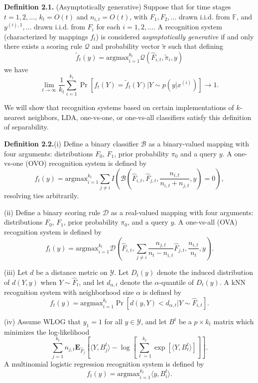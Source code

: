 \documentclass{article}
\newcommand{\E}{\textbf{E}}
\newcommand{\argmax}{\text{argmax}}
\begin{document}
\textbf{Definition 2.1.}  (Asymptotically generative) Suppose that for
time stages $t = 1,2,\hdots$, $k_t = O(t)$ and $n_{i,t} = O(t)$, with
$F_1,F_2,\hdots$ drawn i.i.d. from $\mathbb{F}$, and
$y^{(i),1},\hdots$ drawn i.i.d. from $F_i$ for each $i = 1,2,\hdots$.
A recognition system (characterized by mappings $f_t$) is considered
\emph{asymptotically generative} if and only there exists a scoring
rule $\mathcal{Q}$ and probability vector $\tilde{\pi}$ such that
defining
\[
\tilde{f}_t(y) = \argmax_{i=1}^{k_t} \mathcal{Q}(\hat{F}_{i, t}, \tilde{\pi}_i, y)
\]
we have
\[
\lim_{t \to \infty} \frac{1}{k_t} \sum_{i=1}^{k_t}\Pr[f_t(Y) = \tilde{f}_t(Y) | Y \sim p(y|x^{(i)})] \to 1.
\]

We will show that recognition systems based on certain implementations
of $k$-nearest neighbors, LDA, one-vs-one, or one-vs-all classifiers
satisfy this definition of separability.

\textbf{Definition 2.2.}(i) Define a binary classifier $\mathcal{B}$
as a binary-valued mapping with four arguments: distributions $F_0$,
$F_1$, prior probability $\pi_0$ and a query $y$.  A one-vs-one (OVO)
recognition system is defined by
\[
f_t(y) = \argmax_{i=1}^{k_t} \sum_{j \neq i} I\left(\mathcal{B}(\hat{F}_{i, t}, \hat{F}_{j, t}, \frac{n_{i, t}}{n_{i, t} + n_{j, t}}, y)=0\right),
\]
resolving ties arbitrarily.

(ii) Define a binary scoring rule $\mathcal{D}$ as a real-valued
mapping with four arguments: distributions $F_0$, $F_1$, prior
probability $\pi_0$, and a query $y$.  A one-vs-all (OVA) recognition
system is defined by
\[
f_t(y) = \argmax_{i=1}^{k_t} \mathcal{D}\left(\hat{F}_{i, t},
\sum_{j\neq i} \frac{n_{j, t}}{n_t - n_{i, t}}\hat{F}_{j, t},
\frac{n_{i, t}}{n_t}, y\right).
\]

(iii) Let $d$ be a distance metric on $\mathcal{Y}$.  Let $D_t(y)$
denote the induced distribution of $d(Y, y)$ when $Y \sim \hat{F}_t$,
and let $d_{\alpha, t}$ denote the $\alpha$-quantile of $D_t(y)$.  A
kNN recognition system with neighborhood size $\alpha$ is defined by
\[
f_t(y) = \argmax_{i=1}^{k_t} \Pr[d(y, Y) < d_{\alpha, t} |Y \sim \hat{F}_{i, t}].
\]

(iv) Assume WLOG that $y_1 = 1$ for all $y \in \mathcal{Y}$, and let
$B^t$ be a $p \times k_t$ matrix which minimizes the log-likelihood
\[
\sum_{j=1}^{k_t}n_{j, t}\E_{\hat{F}_j}\left[\langle Y, B^t_j \rangle - \log\left[\sum_{\ell=1}^{k_t} \exp[\langle Y, B^t_\ell \rangle]\right]\right].
\]
A multinomial logistic regression recognition system is defined by
\[
f_t(y) = \argmax_{i=1}^{k_t} \langle y, B^t_i\rangle.
\]
\end{document}
